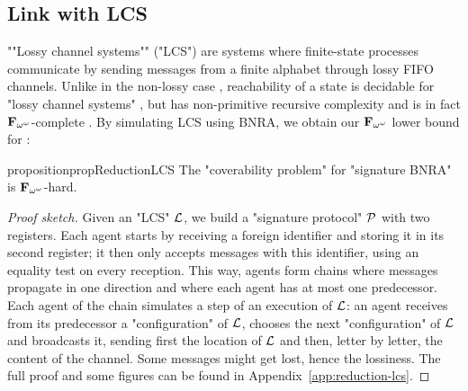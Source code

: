 \subsection{Link with LCS}

""Lossy channel systems"" ("LCS") are systems where finite-state processes communicate by sending messages from a finite alphabet through lossy FIFO channels. Unlike in the non-lossy case \cite{BZ83}, reachability of a state is decidable for "lossy channel systems" \cite{AbdullaJ1996verif}, but has non-primitive recursive complexity \cite{Schnoebelen2002verifying} and is in fact $\mathbf{F}_{\omega^{\omega}}$-complete \cite{ChambartS08ordinal}. 
By simulating LCS using BNRA, we obtain our $\mathbf{F}_{\omega^{\omega}}$ lower bound for \COVER:

\begin{restatable}{proposition}{propReductionLCS}
	\label{prop:reduction-LCS}
	The "coverability problem" for "signature BNRA" is $\mathbf{F}_{\omega^\omega}$-hard.
\end{restatable}
\begin{proof}[Proof sketch]
Given an "LCS" $\mathcal{L}$, we build a "signature protocol" $\mathcal{P}$ with two registers. 
Each agent starts by receiving a foreign identifier and storing it in its second register; it then only accepts messages with this identifier, using an equality test on every reception.
 This way, agents form chains where messages propagate in one direction and where each agent has at most one predecessor. 
 Each agent of the chain simulates a step of an execution of $\mathcal{L}$: an agent receives from its predecessor a "configuration" of $\mathcal{L}$, chooses the next "configuration" of $\mathcal{L}$ and broadcasts it, sending first the location of $\mathcal{L}$ and then, letter by letter, the content of the channel. 
 Some messages might get lost, hence the lossiness. 
 The full proof and some figures can be found in Appendix~\ref{app:reduction-lcs}. 
\end{proof}




